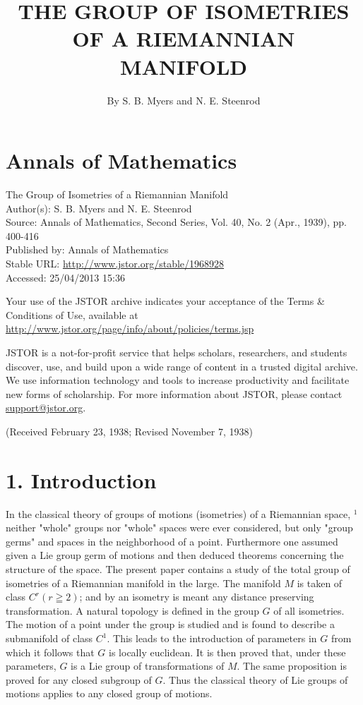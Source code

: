 \documentclass[10pt]{article}
\title{THE GROUP OF ISOMETRIES OF A RIEMANNIAN MANIFOLD }
\author{By S. B. Myers and N. E. Steenrod}
\date{}
\begin{document}
\maketitle
\section*{Annals of Mathematics}
The Group of Isometries of a Riemannian Manifold\\
Author(s): S. B. Myers and N. E. Steenrod\\
Source: Annals of Mathematics, Second Series, Vol. 40, No. 2 (Apr., 1939), pp. 400-416\\
Published by: Annals of Mathematics\\
Stable URL: \href{http://www.jstor.org/stable/1968928}{http://www.jstor.org/stable/1968928}\\
Accessed: 25/04/2013 15:36

Your use of the JSTOR archive indicates your acceptance of the Terms \& Conditions of Use, available at \href{http://www.jstor.org/page/info/about/policies/terms.jsp}{http://www.jstor.org/page/info/about/policies/terms.jsp}

JSTOR is a not-for-profit service that helps scholars, researchers, and students discover, use, and build upon a wide range of content in a trusted digital archive. We use information technology and tools to increase productivity and facilitate new forms of scholarship. For more information about JSTOR, please contact \href{mailto:support@jstor.org}{support@jstor.org}.

(Received February 23, 1938; Revised November 7, 1938)

\section*{1. Introduction}
In the classical theory of groups of motions (isometries) of a Riemannian space, ${ }^{1}$ neither "whole" groups nor "whole" spaces were ever considered, but only "group germs" and spaces in the neighborhood of a point. Furthermore one assumed given a Lie group germ of motions and then deduced theorems concerning the structure of the space. The present paper contains a study of the total group of isometries of a Riemannian manifold in the large. The manifold $M$ is taken of class $C^{r}(r \geqq 2)$; and by an isometry is meant any distance preserving transformation. A natural topology is defined in the group $G$ of all isometries. The motion of a point under the group is studied and is found to describe a submanifold of class $C^{1}$. This leads to the introduction of parameters in $G$ from which it follows that $G$ is locally euclidean. It is then proved that, under these parameters, $G$ is a Lie group of transformations of $M$. The same proposition is proved for any closed subgroup of $G$. Thus the classical theory of Lie groups of motions applies to any closed group of motions.
\end{document}
